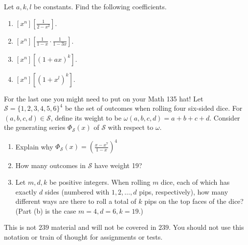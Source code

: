 \begin{enumerate}
     Let $a,k,l$ be constants. Find the following coefficients.
    \begin{enumerate}
        \item $[x^n] \left[ \frac{1}{2-x^2} \right]$.
        \item $[x^n] \left[ \frac{1}{1-x} \cdot \frac{1}{1-3x} \right]$.
        \item $[x^n] \left[ (1+ax)^k \right]$.
        \item $[x^n] \left[ (1+x^l)^k \right]$.
    \end{enumerate}
    For the last one you might need to put on your Math 135 hat!
     Let $\mathscr{S} = \{1, 2, 3, 4, 5, 6\}^4$ be the set of outcomes when rolling four six-sided dice. For $(a, b, c, d) \in \mathscr{S}$, define its weight to be
$\omega(a, b, c, d) = a + b + c + d$. Consider the generating series  $\Phi_\mathscr{S}(x)$ of $\mathscr{S}$ with respect to $\omega$.
\begin{enumerate}
    \item Explain why $\Phi_\mathscr{S}(x) = \left(\frac{x-x^7}{1-x}\right)^4$
    \item How many outcomes in $\mathscr{S}$ have weight 19?
    \item Let $m,d,k$ be positive integers. When rolling $m$ dice, each of which has exactly $d$ sides (numbered with $1,2, \dots, d$ pips, respectively), how many different ways are there to roll a total of $k$ pips on the top faces of the dice? (Part (b) is the case $m=4, d=6, k = 19$.)
\end{enumerate}


     This is not $239$ material and will not be covered in $239$. You should not use this notation or train of thought for assignments or tests.
    

\end{enumerate}
